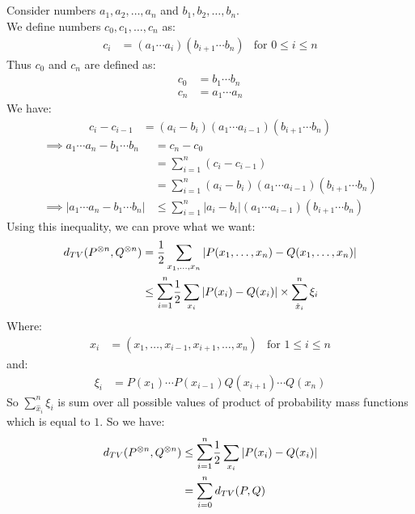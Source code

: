 \documentclass{article}
\numberwithin{equation}{section}
\begin{document}
\subsection{}
Consider numbers \(a_1, a_2, \ldots, a_n\) and \(b_1, b_2, \ldots, b_n\).\\
We define numbers \(c_0, c_1, \ldots, c_n\) as:
\begin{align}
c_i &= (a_1  \cdots  a_i)(b_{i+1} \cdots b_n) & \text{for } 0 \le i \le n
\end{align}
Thus \(c_0\) and \(c_n\) are defined as:
\begin{align}
c_0 &= b_1 \cdots b_n\\
c_n &= a_1 \cdots a_n
\end{align}
We have:
\begin{align}
c_i - c_{i-1} &= (a_i - b_i)(a_1  \cdots  a_{i-1})(b_{i+1} \cdots b_n)
\end{align}
\begin{align}
\implies a_1 \cdots a_n - b_1 \cdots b_n &= c_n - c_0\\
&= \sum_{i=1}^n (c_i - c_{i-1})\\
&= \sum_{i=1}^n (a_i - b_i)(a_1  \cdots  a_{i-1})(b_{i+1} \cdots b_n)\\
\implies \vert a_1 \cdots a_n - b_1 \cdots b_n \vert & \le  \sum_{i=1}^n \vert a_i - b_i \vert(a_1  \cdots  a_{i-1})(b_{i+1} \cdots b_n)
\end{align} 
Using this inequality, we can prove what we want:
\begin{align}
d_{TV}(P^{\otimes n}, Q^{\otimes n}) &= \frac{1}{2}\sum_{x_1, \ldots, x_n} \vert P(x_1, \ldots, x_n) - Q(x_1, \ldots, x_n) \vert\\
& \le \mathlarger{\sum}_{i=1}^n \frac{1}{2} \sum_{x_i} \vert P(x_i) - Q(x_i) \vert \times \sum_{\hat{x}_i}^n \xi_i
\end{align}
Where:
\begin{align}
\hat{x}_i &= (x_1, \ldots, x_{i-1}, x_{i+1}, \ldots, x_n) & \text{for } 1 \le i \le n
\end{align}
and:
\begin{align}
\xi_i &= P(x_1) \cdots P(x_{i-1}) Q(x_{i+1}) \cdots Q(x_n)
\end{align}
So \(\sum_{\hat{x}_i}^n \xi_i\) is sum over all possible values of product of probability mass functions which is equal to \(1\). So we have:
\begin{align}
d_{TV}(P^{\otimes n}, Q^{\otimes n}) &\le \mathlarger{\sum}_{i=1}^n \frac{1}{2}\sum_{x_i} \vert P(x_i) - Q(x_i) \vert\\
&= \sum_{i=0}^n d_{TV}(P, Q)
\end{align}
\end{document}
